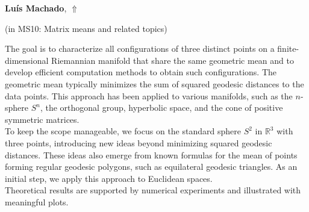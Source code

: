 \documentclass[ILAS2025-program.tex]{subfiles}
\begin{document}
\hypertarget{down0055}{}\begin{ilasabstract}
    
\textbf{Luís Machado},  \hfill \hyperlink{up0055}{$\Uparrow$}
    
    
(in {\color{mstitle}MS10: Matrix means and related topics})
        
\mtskip
    The goal is to characterize all configurations of three distinct points on a finite-dimensional Riemannian manifold that share the same geometric mean and to develop efficient computation methods to obtain such configurations. The geometric mean typically minimizes the sum of squared geodesic distances to the data points. This approach has been applied to various manifolds, such as the \(n\)-sphere \(S^n\), the orthogonal group, hyperbolic space, and the cone of positive symmetric matrices.  \\
To keep the scope manageable, we focus on the standard sphere \(S^2\) in \(\mathbb{R}^3\) with three points, introducing new ideas beyond minimizing squared geodesic distances. These ideas also emerge from known formulas for the mean of points forming regular geodesic polygons, such as equilateral geodesic triangles. As an initial step, we apply this approach to Euclidean spaces. \\
Theoretical results are supported by numerical experiments and illustrated with meaningful plots.\\ \\

\end{ilasabstract}
    
\end{document}
